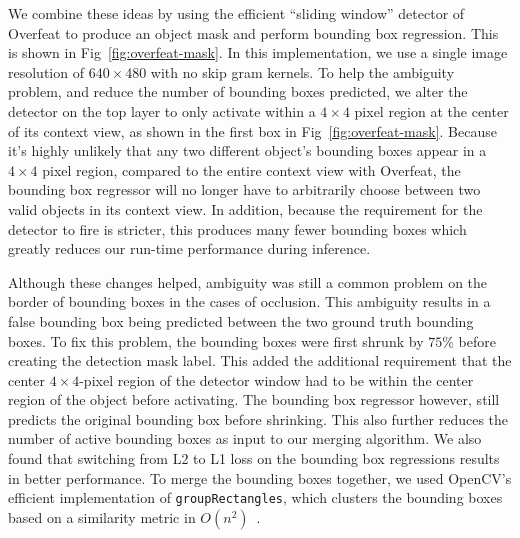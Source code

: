 \documentclass[journal]{IEEEtran}
\begin{document}
We combine these ideas by using the efficient ``sliding window'' detector of Overfeat to produce an object mask and perform bounding box regression. This is shown in Fig~\ref{fig:overfeat-mask}. In this implementation, we use a single image resolution of $640 \times 480$ with no skip gram kernels. To help the ambiguity problem, and reduce the number of bounding boxes predicted, we alter the detector on the top layer to only activate within a $4 \times 4$ pixel region at the center of its context view, as shown in the first box in Fig~\ref{fig:overfeat-mask}. Because it's highly unlikely that any two different object's bounding boxes appear in a $4 \times 4$ pixel region, compared to the entire context view with Overfeat, the bounding box regressor will no longer have to arbitrarily choose between two valid objects in its context view. In addition, because the requirement for the detector to fire is stricter, this produces many fewer bounding boxes which greatly reduces our run-time performance during inference. 

Although these changes helped, ambiguity was still a common problem on the border of bounding boxes in the cases of occlusion. This ambiguity results in a false bounding box being predicted between the two ground truth bounding boxes. To fix this problem, the bounding boxes were first shrunk by $75\%$ before creating the detection mask label. This added the additional requirement that the center $4 \times 4$-pixel region of the detector window had to be within the center region of the object before activating. The bounding box regressor however, still predicts the original bounding box before shrinking. This also further reduces the number of active bounding boxes as input to our merging algorithm. We also found that switching from L2 to L1 loss on the bounding box regressions results in better performance. To merge the bounding boxes together, we used OpenCV's efficient implementation of \texttt{groupRectangles}, which clusters the bounding boxes based on a similarity metric in $O(n^2)$~\cite{opencv}. 
\end{document}
